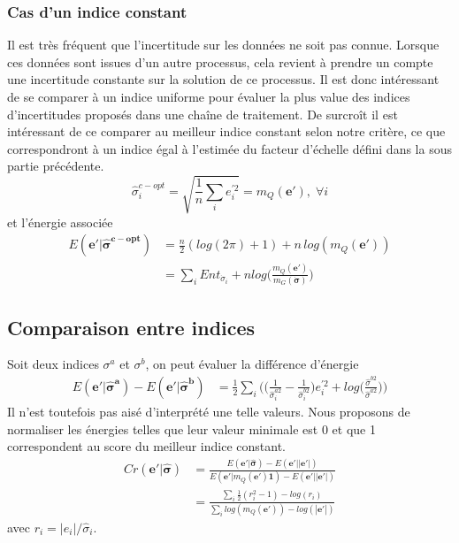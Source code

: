 \documentclass[../main/These_Mathias_Paget.tex]{subfiles}
\begin{document}
\subsubsection{Cas d'un indice constant}
Il est très fréquent que l'incertitude sur les données ne soit pas connue. Lorsque ces données sont issues d'un autre processus, cela revient à prendre un compte une incertitude constante sur la solution de ce processus. Il est donc intéressant de se comparer à un indice uniforme pour évaluer la plus value des indices d'incertitudes proposés dans une chaîne de traitement. De surcroît il est intéressant de ce comparer au meilleur indice constant selon notre critère, ce que correspondront à un indice égal à l'estimée du facteur d’échelle défini dans la sous partie précédente.
\begin{equation}
\hat{\sigma}^{c-opt}_i = \sqrt{\frac{1}{n}\sum_i{e_i^{'2}}} = m_Q(\boldsymbol{e'}), \; \forall i
\end{equation}
et l’énergie associée
\begin{equation}
\begin{aligned}
E(\boldsymbol{e'}|\boldsymbol{\hat{\sigma}^{c-opt}})  &= \frac{n}{2}(log(2\pi)+1) + n \, log (m_Q(\boldsymbol{e'}))  \\
&= \sum_iEnt_{\dot{\sigma}_i} + n log \Big( \frac{m_Q(\boldsymbol{e'})}{m_G(\boldsymbol{\dot{\sigma}})}\Bigg)
\end{aligned}
\end{equation}

\subsection{Comparaison entre indices}

Soit deux indices $\sigma^a$ et $\sigma^b$, on peut évaluer la différence d'énergie
\begin{equation}
\begin{aligned}
E(\boldsymbol{e'}|\boldsymbol{\hat{\sigma}^a}) - E(\boldsymbol{e'}|\boldsymbol{\hat{\sigma}^b})  &= \frac{1}{2}  \sum_i \Bigg( \Big(\frac{1}{\hat{\sigma}^{a2}_i} - \frac{1}{\hat{\sigma}^{b2}_i} \Big)e_i^{'2} + log \Big( \frac{\hat{\sigma}^{b2}}{\hat{\sigma}^{a2}} \Big) \Bigg)
\end{aligned}
\end{equation}
Il n'est toutefois pas aisé d'interprété une telle valeurs. Nous proposons de normaliser les énergies telles que leur valeur minimale est 0 et que 1 correspondent au score du meilleur indice constant.
\begin{equation}
\begin{aligned}
Cr(\boldsymbol{e'}|\boldsymbol{\hat{\sigma}}) &= \frac{E(\boldsymbol{e'}|\boldsymbol{\hat{\sigma}}) - E(\boldsymbol{e'}||\boldsymbol{e'}|)}{E(\boldsymbol{e'}|m_Q(\boldsymbol{e'})\boldsymbol{1}) - E(\boldsymbol{e'}||\boldsymbol{e'}|)} \\
&=   \frac{ \sum_i{\frac{1}{2}( r^2_i - 1)  - log(r_i)}}{ \sum_i{log(m_Q(\boldsymbol{e'}))- log(|\boldsymbol{e'}|)}}
\end{aligned}
\end{equation}
avec $r_i = |e_i|/\hat{\sigma}_i$.
\end{document}
